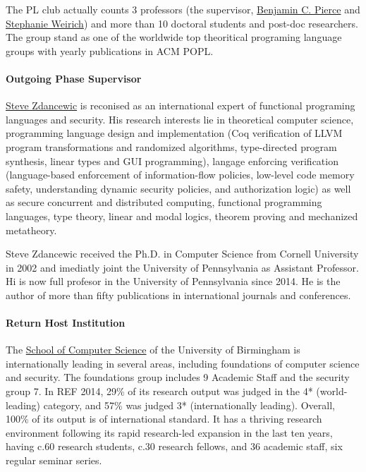 \documentclass{article}[11pt]
\begin{document}
The PL club actually counts 3 professors (the supervisor, \href{http://www.cis.upenn.edu/~bcpierce/}{Benjamin C. Pierce} and  \href{http://www.cis.upenn.edu/~sweirich/}{Stephanie Weirich}) and more than 10 doctoral students and post-doc researchers. The group stand as one of the worldwide top theoritical programing language groups with yearly publications in ACM POPL.


\paragraph{Outgoing Phase Supervisor}
\href{http://www.cis.upenn.edu/~stevez/}{Steve Zdancewic} is reconised as an international expert of functional programing languages and security. His research interests lie in theoretical computer science, programming language design and implementation (Coq verification of LLVM program transformations and randomized algorithms, type-directed program synthesis, linear types and GUI programming), langage enforcing verification (language-based enforcement of information-flow policies, low-level code memory safety, understanding dynamic security policies, and authorization logic) as well as secure concurrent and distributed computing, functional programming languages, type theory, linear and modal logics, theorem proving and mechanized metatheory. 

Steve Zdancewic received the Ph.D. in Computer Science from Cornell University in 2002 and imediatly joint the University of Pennsylvania as Assistant Professor. Hi is now full profesor in the University of Pennsylvania since 2014. He is the author of more than fifty publications in international journals and conferences.


\paragraph{Return Host Institution}
The \href{http://www.cs.bham.ac.uk/}{School of Computer Science} of the University of Birmingham is
internationally leading in several areas, including foundations of
computer science and security. The foundations group includes 9
Academic Staff and the security group 7. In REF 2014, 29\% of its
research output was judged in the 4* (world-leading) category, and
57\% was judged 3* (internationally leading). Overall, 100\% of its
output is of international standard. It has a thriving research
environment following its rapid research-led expansion in the last ten
years, having c.60 research students, c.30 research fellows, and 36
academic staff, six regular seminar series.
\end{document}
